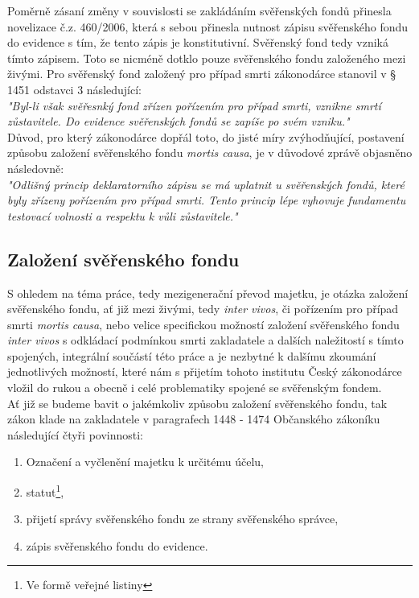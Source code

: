 \documentclass{article}
\begin{document}
Poměrně zásaní změny v souvislosti se zakládáním svěřenských fondů přinesla novelizace č.z. 460/2006, která s sebou přinesla nutnost zápisu svěřenského fondu do evidence s tím, že tento zápis je konstitutivní. Svěřenský fond tedy vzniká tímto zápisem. Toto se nicméně dotklo pouze svěřenského fondu založeného mezi živými. Pro svěřenský fond založený pro případ smrti zákonodárce stanovil v § 1451 odstavci 3 následující:\\

\textit{"Byl-li však svěřesnký fond zřízen pořízením pro případ smrti, vznikne smrtí zůstavitele. Do evidence svěřenských fondů se zapíše po svém vzniku."}\\

Důvod, pro který zákonodárce dopřál toto, do jisté míry zvýhodňující, postavení způsobu založení svěřenského fondu \textit{mortis causa}, je v důvodové zprávě objasněno následovně:\\

\textit{"Odlišný princip deklaratorního zápisu se má uplatnit u svěřenských fondů, které byly zřízeny pořízením pro případ smrti. Tento princip lépe vyhovuje fundamentu testovací volnosti a respektu k vůli zůstavitele."}

\newpage
\thispagestyle{smallertextinheader}

\subsection{Založení svěřenského fondu}

S ohledem na téma práce, tedy mezigenerační převod majetku, je otázka založení svěřenského fondu, ať již mezi živými, tedy \textit{inter vivos}, či pořízením pro případ smrti \textit{mortis causa}, nebo velice specifickou možností založení svěřenského fondu \textit{inter vivos} s odkládací podmínkou smrti zakladatele a dalších naležitostí s tímto spojených, integrální součástí této práce a je nezbytné k dalšímu zkoumání jednotlivých možností, které nám s přijetím tohoto institutu Český zákonodárce vložil do rukou a obecně i celé problematiky spojené se svěřenským fondem. \\

Ať již se budeme bavit o jakémkoliv způsobu založení svěřenského fondu, tak zákon klade na zakladatele v paragrafech 1448 - 1474 Občanského zákoníku následující čtyři povinnosti:

\begin{enumerate}
\item Označení a vyčlenění majetku k určitému účelu,
\item statut\footnote{Ve formě veřejné listiny},
\item přijetí správy svěřenského fondu ze strany svěřenského správce,
\item zápis svěřenského fondu do evidence.
\end{enumerate}
\end{document}
